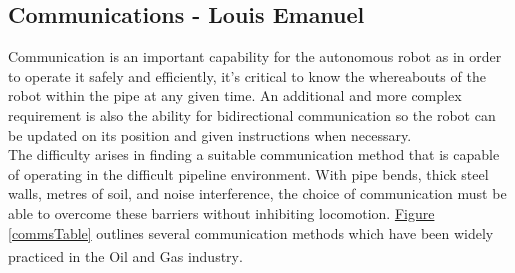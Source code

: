 \documentclass[11pt]{article}		%
\newcommand{\supercite}[1]{\textsuperscript{\cite{#1}}}		%
\newcommand{\figref}[1]{\hyperref[#1]{Figure \ref*{#1}}}    %
\begin{document}
		\subsection[Communications]{Communications - Louis Emanuel}

			Communication is an important capability for the autonomous robot as in order to operate it safely and efficiently, it's critical to know the whereabouts of the robot within the pipe at any given time. 
			An additional and more complex requirement is also the ability for bidirectional communication so the robot can be updated on its position and given instructions when necessary. 
			\\
		    The difficulty arises in finding a suitable communication method that is capable of operating in the difficult pipeline environment. 
		    With pipe bends, thick steel walls, metres of soil, and noise interference, the choice of communication must be able to overcome these barriers without inhibiting locomotion. 
		    \figref{commsTable} outlines several communication methods which have been widely practiced in the Oil and Gas industry\supercite{acoustic2020}.
		    \\
		    
\end{document}
